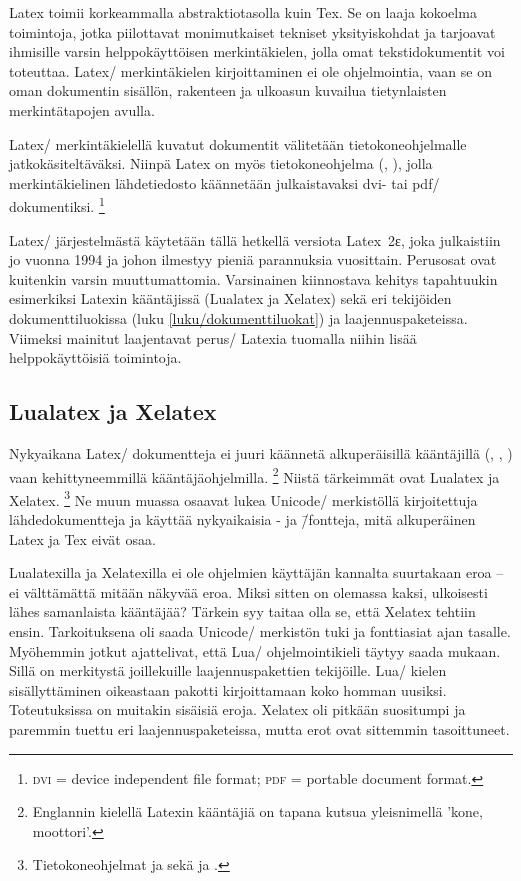Latex toimii korkeammalla abstraktiotasolla kuin Tex. Se on laaja
kokoelma toimintoja, jotka piilottavat monimutkaiset tekniset
yksityiskohdat ja tarjoavat ihmisille varsin helppokäyttöisen
merkintäkielen, jolla omat tekstidokumentit voi toteuttaa. Latex\-/
merkintäkielen kirjoittaminen ei ole ohjelmointia, vaan se on oman
dokumentin sisällön, rakenteen ja ulkoasun kuvailua tietynlaisten
merkintätapojen avulla.

Latex\-/ merkintäkielellä kuvatut dokumentit välitetään
tietokoneohjelmalle jatkokäsiteltäväksi. Niinpä Latex on myös
tietokoneohjelma (, ), jolla
merkintäkielinen lähdetiedosto käännetään julkaistavaksi dvi- tai pdf\-/
dokumentiksi.%
\footnote{\textsc{dvi} = device independent file format; \textsc{pdf} =
  portable document format.}

Latex\-/ järjestelmästä käytetään tällä hetkellä versiota Latex~2ε, joka
julkaistiin jo vuonna 1994 ja johon ilmestyy pieniä parannuksia
vuosittain. Perusosat ovat kuitenkin varsin muuttumattomia. Varsinainen
kiinnostava kehitys tapahtuukin esimerkiksi Latexin kääntäjissä
(Lualatex ja Xelatex) sekä eri tekijöiden dokumenttiluokissa (luku
\ref{luku/dokumenttiluokat}) ja laajennuspaketeissa. Viimeksi mainitut
laajentavat perus\-/ Latexia tuomalla niihin lisää helppokäyttöisiä
toimintoja.

\subsection{Lualatex ja Xelatex}

Nykyaikana Latex\-/ dokumentteja ei juuri käännetä alkuperäisillä
kääntäjillä (, , ) vaan
kehittyneemmillä kääntäjäohjelmilla.%
\footnote{Englannin kielellä Latexin kääntäjiä on tapana kutsua
  yleisnimellä  'kone, moottori'.} Niistä tärkeimmät
ovat Lualatex ja Xelatex.%
\footnote{Tietokoneohjelmat  ja  sekä
   ja .} Ne muun muassa osaavat lukea
Unicode\-/ merkistöllä kirjoitettuja lähdedokumentteja ja käyttää
nykyaikaisia - ja  \=/fontteja,
mitä alkuperäinen Latex ja Tex eivät osaa.

Lualatexilla ja Xelatexilla ei ole ohjelmien käyttäjän kannalta
suurtakaan eroa -- ei välttämättä mitään näkyvää eroa. Miksi sitten on
olemassa kaksi, ulkoisesti lähes samanlaista kääntäjää? Tärkein syy
taitaa olla se, että Xelatex tehtiin ensin. Tarkoituksena oli saada
Unicode\-/ merkistön tuki ja fonttiasiat ajan tasalle. Myöhemmin jotkut
ajattelivat, että Lua\-/ ohjelmointikieli täytyy saada mukaan. Sillä on
merkitystä joillekuille laajennuspakettien tekijöille. Lua\-/ kielen
sisällyttäminen oikeastaan pakotti kirjoittamaan koko homman uusiksi.
Toteutuksissa on muitakin sisäisiä eroja. Xelatex oli pitkään suositumpi
ja paremmin tuettu eri laajennuspaketeissa, mutta erot ovat sittemmin
tasoittuneet.

